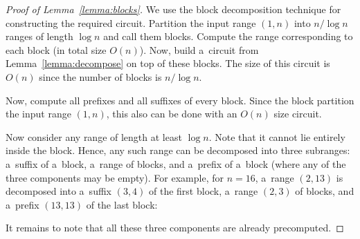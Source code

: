 \documentclass[11pt,letterpaper]{article}
\begin{document}
\begin{proof}[Proof of Lemma~\ref{lemma:blocks}]
We use the block decomposition technique for
constructing the required circuit.
Partition the input range $(1,n)$ into $n/\log n$ ranges
of length $\log n$ and call them blocks. Compute the range
corresponding to each block (in total size $O(n)$).
Now, build a~circuit from Lemma~\ref{lemma:decompose} on
top of these blocks. The size of this circuit is $O(n)$ since the
number of blocks is $n/\log n$.

Now, compute all prefixes and all suffixes of every block. Since
the block partition the input range $(1,n)$, this also can be done
with an $O(n)$ size circuit.

Now consider any range of length at least $\log n$. Note that it
cannot lie entirely inside the block. Hence, any such range can be
decomposed into three subranges: a~suffix of a~block, a~range
of blocks, and a~prefix of a~block
(where any of the three components may be empty). For example, for $n=16$,
a~range $(2,13)$ is decomposed into a~suffix $(3,4)$ of the
first block,
a~range $(2,3)$ of blocks, and a~prefix $(13,13)$ of
the last block:
\begin{center}
\end{center}
It remains to note that all these three components are already precomputed.
\end{proof}
\end{document}
